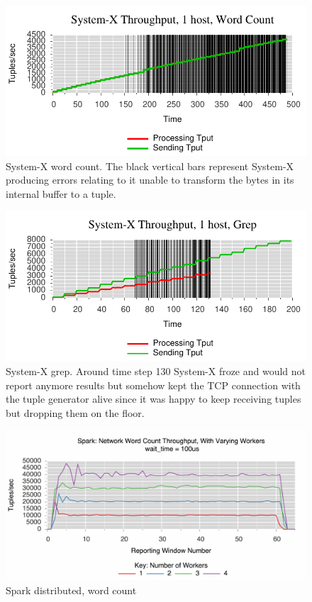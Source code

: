 \begin{figure}[t]
\centering
\includegraphics[width=1\linewidth]{figures/sb1_tput.pdf}
\caption{System-X word count. The black vertical bars represent System-X producing errors relating to it unable to transform the bytes in its internal buffer to a tuple.}
\label{fig:label-me-if-you-want}
\end{figure}

\begin{figure}[t]
\centering
\includegraphics[width=1\linewidth]{figures/sb2_tput.pdf}
\caption{System-X grep. Around time step 130 System-X froze and would not report anymore results but somehow kept the TCP connection with the tuple generator alive since it was happy to keep receiving tuples but dropping them on the floor.}
\label{fig:label-me-if-you-want}
\end{figure}


\begin{figure}[t]
\centering
\includegraphics[width=1\linewidth]{figures/spark-wc-dist.pdf}
\caption{Spark distributed, word count}
\label{fig:label-me-if-you-want}
\end{figure}


